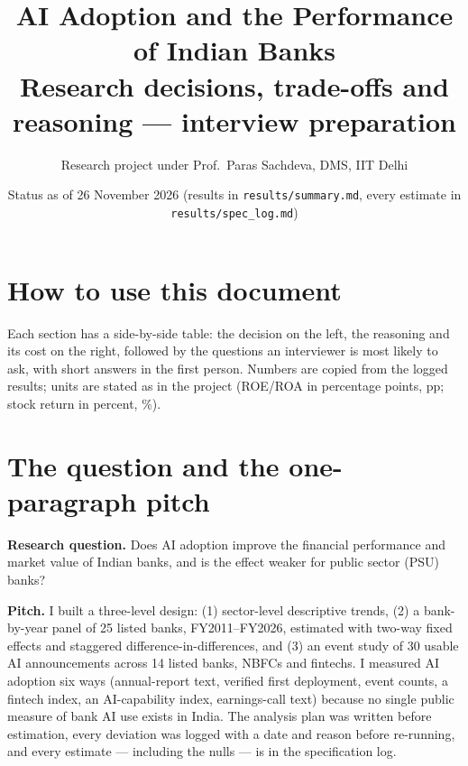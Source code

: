 \documentclass[10.5pt,a4paper]{article}
\title{\textbf{AI Adoption and the Performance of Indian Banks}\\[3pt]
\large Research decisions, trade-offs and reasoning --- interview preparation}
\author{Research project under Prof.\ Paras Sachdeva, DMS, IIT Delhi}
\date{Status as of 26 November 2026 (results in \texttt{results/summary.md}, every estimate in \texttt{results/spec\_log.md})}
\begin{document}
\maketitle

\section*{How to use this document}
Each section has a side-by-side table: the decision on the left, the reasoning and its cost on the right, followed by
the questions an interviewer is most likely to ask, with short answers in the first person. Numbers are copied from the
logged results; units are stated as in the project (ROE/ROA in percentage points, pp; stock return in percent, \%).

\section{The question and the one-paragraph pitch}
\textbf{Research question.} Does AI adoption improve the financial performance and market value of Indian banks, and is
the effect weaker for public sector (PSU) banks?

\textbf{Pitch.} I built a three-level design: (1) sector-level descriptive trends, (2) a bank-by-year panel of 25
listed banks, FY2011--FY2026, estimated with two-way fixed effects and staggered difference-in-differences, and (3) an
event study of 30 usable AI announcements across 14 listed banks, NBFCs and fintechs. I measured AI adoption six ways
(annual-report text, verified first deployment, event counts, a fintech index, an AI-capability index, earnings-call
text) because no single public measure of bank AI use exists in India. The analysis plan was written before
estimation, every deviation was logged with a date and reason before re-running, and every estimate --- including the
nulls --- is in the specification log.
\end{document}
